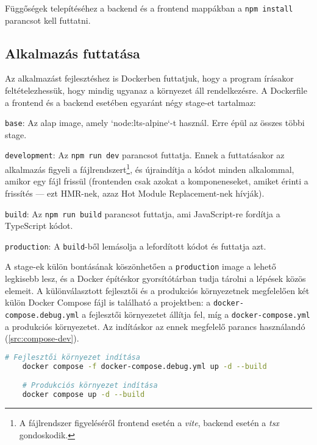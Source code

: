 Függőségek telepítéséhez a backend és a frontend mappákban a \texttt{npm install} parancsot kell futtatni.

\subsection{Alkalmazás futtatása}

Az alkalmazást fejlesztéshez is Dockerben futtatjuk, hogy a program írásakor feltételezhessük, hogy mindig ugyanaz a környezet áll rendelkezésre. A Dockerfile a frontend és a backend esetében egyaránt négy stage-et tartalmaz:

\begin{compactenum}
    \item \texttt{base}: Az alap image, amely `node:lts-alpine`-t használ. Erre épül az összes többi stage.
    \item \texttt{development}: Az \texttt{npm run dev} parancsot futtatja. Ennek a futtatásakor az alkalmazás figyeli a fájlrendszert\footnote{A fájlrendszer figyeléséről frontend esetén a \textit{vite}, backend esetén a \textit{tsx} gondoskodik.}, és újraindítja a kódot minden alkalommal, amikor egy fájl frissül (frontenden csak azokat a komponeneseket, amiket érinti a frissítés --- ezt HMR-nek, azaz Hot Module Replacement-nek hívják\cite{hmr}).
    \item \texttt{build}: Az \texttt{npm run build} parancsot futtatja, ami JavaScript-re fordítja a TypeScript kódot.
    \item \texttt{production}: A \texttt{build}-ből lemásolja a lefordított kódot és futtatja azt.
\end{compactenum}

A stage-ek külön bontásának köszönhetően a \texttt{production} image a lehető legkisebb lesz, és a Docker építéskor gyorsítótárban tudja tárolni a lépések közös elemeit. A különválasztott fejlesztői és a produkciós környezetnek megfelelően két külön Docker Compose fájl is található a projektben: a \texttt{docker-compose.debug.yml} a fejlesztői környezetet állítja fel, míg a \texttt{docker-compose.yml} a produkciós környezetet. Az indításkor az ennek megfelelő parancs használandó (\ref{src:compose-dev}).

\begin{lstlisting}[language={bash}]
    # Fejlesztői környezet indítása
    docker compose -f docker-compose.debug.yml up -d --build

    # Produkciós környezet indítása
    docker compose up -d --build
\end{lstlisting}

